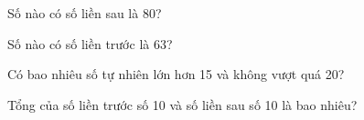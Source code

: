 \begin{ex}
Số nào có số liền sau là 80?
\end{ex}

\begin{ex}
Số nào có số liền trước là 63?
\end{ex}

\begin{ex}
Có bao nhiêu số tự nhiên lớn hơn 15 và không vượt quá 20?
\end{ex}

\begin{ex}
Tổng của số liền trước số 10 và số liền sau số 10 là bao nhiêu?
\end{ex}
